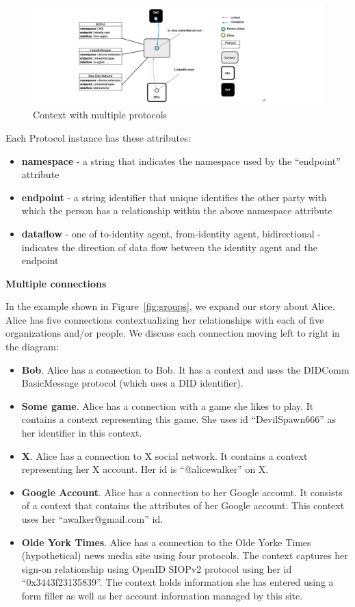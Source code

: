 \documentclass[11pt, oneside]{article}   	%
\begin{document}
\begin{figure}[htbp]
	\includegraphics[width=\textwidth]{./images/context-with-n-protocols.png}
	\caption{Context with multiple protocols}
	\label{fig:n-protocols}
\end{figure}

Each Protocol instance has these attributes:
\begin{itemize}
\item \textbf{namespace} - a string that indicates the namespace used by the ``endpoint'' attribute
\item \textbf{endpoint} - a string identifier that unique identifies the other party with which the person has a relationship within the above namespace attribute
\item \textbf{dataflow} - one of {to-identity agent, from-identity agent, bidirectional} - indicates the direction of data flow between the identity agent and the endpoint
\end{itemize}

\textbf{Multiple connections}

In the example shown in Figure~\ref{fig:groups}, we expand our story about Alice. Alice has five connections contextualizing her relationships with each of five organizations and/or people. We discuss each connection moving left to right in the diagram:

\begin{itemize}
	\item \textbf{Bob}. Alice has a connection to Bob. It has a   context and uses the DIDComm BasicMessage protocol (which uses a DID identifier).
	\item \textbf{Some game}. Alice has a connection with a game she likes to play. It contains a context representing this game. She uses id ``DevilSpawn666'' as her identifier in this context.  
	\item \textbf{X}. Alice has a connection to X social network. It contains a context representing her X account. Her id is ``@alicewalker'' on X.
	\item \textbf{Google Account}. Alice has a connection to her Google account. It consists of a context that contains the attributes of her Google account. This context uses her ``awalker@gmail.com'' id. 
	\item \textbf{Olde York Times}. Alice has a connection to the Olde Yorke Times (hypothetical) news media site using four protocols. The context captures her sign-on relationship using OpenID SIOPv2 protocol using her id ``0x3443f23135839''. The context holds information she has entered using a form filler as well as her account information managed by this site. 
\end{itemize}
\end{document}
